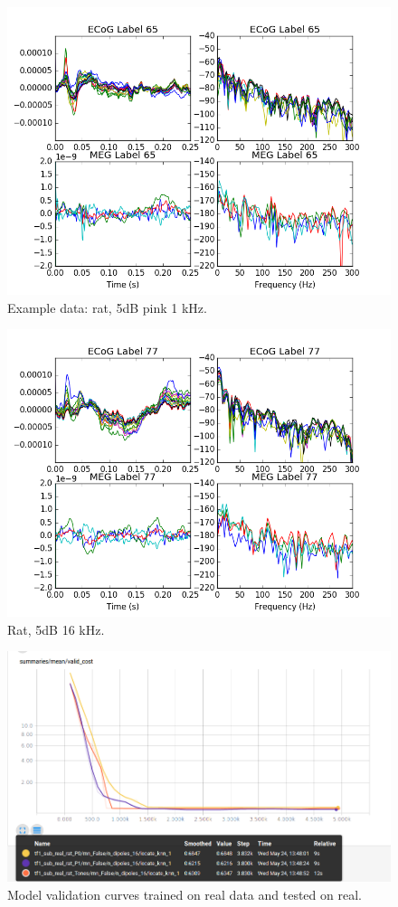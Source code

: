 \documentclass[journal,12pt,onecolumn,draftclsnofoot]{IEEEtran}
\begin{document}
\begin{figure}[h!]
\centering
\includegraphics[width=5in]{finalplots/rat5db1k}
\caption{Example data: rat, 5dB pink 1 kHz.}
\label{fig:rat5db1k}
\end{figure}

\begin{figure}[h!]
\centering
\includegraphics[width=5in]{finalplots/rat5db16k}
\caption{Rat, 5dB 16 kHz.}
\label{fig:rat5db16k}
\end{figure}


\begin{figure}[h!]
\centering
\includegraphics[width=5in]{finalplots/train_real_test_real_valid}
\caption{Model validation curves trained on real data and tested on real.}
\label{fig:realreal}
\end{figure}
\end{document}
